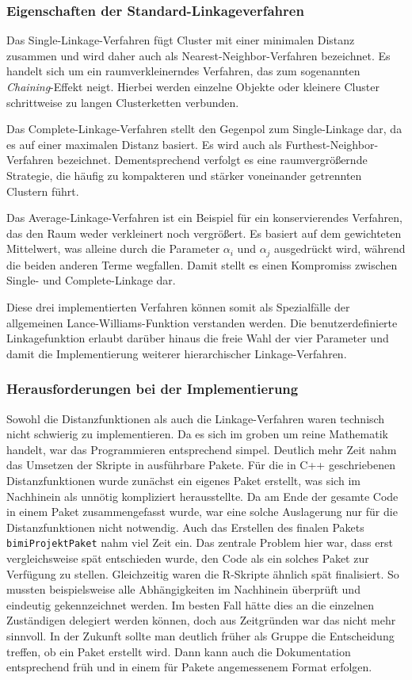 \documentclass[12pt]{article}
\begin{document}
\subsubsection{Eigenschaften der Standard-Linkageverfahren}
\label{standard-linkage-eigenschaften}
Das Single-Linkage-Verfahren fügt Cluster mit einer minimalen Distanz zusammen und wird daher auch als Nearest-Neighbor-Verfahren bezeichnet. Es handelt sich um ein raumverkleinerndes Verfahren, das zum sogenannten \textit{Chaining}-Effekt neigt. Hierbei werden einzelne Objekte oder kleinere Cluster schrittweise zu langen Clusterketten verbunden.

Das Complete-Linkage-Verfahren stellt den Gegenpol zum Single-Linkage dar, da es auf einer maximalen Distanz basiert. Es wird auch als Furthest-Neighbor-Verfahren bezeichnet. Dementsprechend verfolgt es eine raumvergrößernde Strategie, die häufig zu kompakteren und stärker voneinander getrennten Clustern führt.

Das Average-Linkage-Verfahren ist ein Beispiel für ein konservierendes Verfahren, das den Raum weder verkleinert noch vergrößert. Es basiert auf dem gewichteten Mittelwert, was alleine durch die Parameter $\alpha_i$ und $\alpha_j$ ausgedrückt wird, während die beiden anderen Terme wegfallen. Damit stellt es einen Kompromiss zwischen Single- und Complete-Linkage dar.

Diese drei implementierten Verfahren können somit als Spezialfälle der allgemeinen Lance-Williams-Funktion verstanden werden. Die benutzerdefinierte Linkagefunktion erlaubt darüber hinaus die freie Wahl der vier Parameter und damit die Implementierung weiterer hierarchischer Linkage-Verfahren.

\subsubsection{Herausforderungen bei der Implementierung}
\label{herausforderungen-wiktoria}
Sowohl die Distanzfunktionen als auch die Linkage-Verfahren waren technisch nicht schwierig zu implementieren. Da es sich im groben um reine Mathematik handelt, war das Programmieren entsprechend simpel. Deutlich mehr Zeit nahm das Umsetzen der Skripte in ausführbare Pakete. Für die in C++ geschriebenen Distanzfunktionen wurde zunächst ein eigenes Paket erstellt, was sich im Nachhinein als unnötig kompliziert herausstellte. Da am Ende der gesamte Code in einem Paket zusammengefasst wurde, war eine solche Auslagerung nur für die Distanzfunktionen nicht notwendig. Auch das Erstellen des finalen Pakets \verb*|bimiProjektPaket| nahm viel Zeit ein. Das zentrale Problem hier war, dass erst vergleichsweise spät entschieden wurde, den Code als ein solches Paket zur Verfügung zu stellen. Gleichzeitig waren die R-Skripte ähnlich spät finalisiert. So mussten beispielsweise alle Abhängigkeiten im Nachhinein überprüft und eindeutig gekennzeichnet werden. Im besten Fall hätte dies an die einzelnen Zuständigen delegiert werden können, doch aus Zeitgründen war das nicht mehr sinnvoll. In der Zukunft sollte man deutlich früher als Gruppe die Entscheidung treffen, ob ein Paket erstellt wird. Dann kann auch die Dokumentation entsprechend früh und in einem für Pakete angemessenem Format erfolgen.
\end{document}
